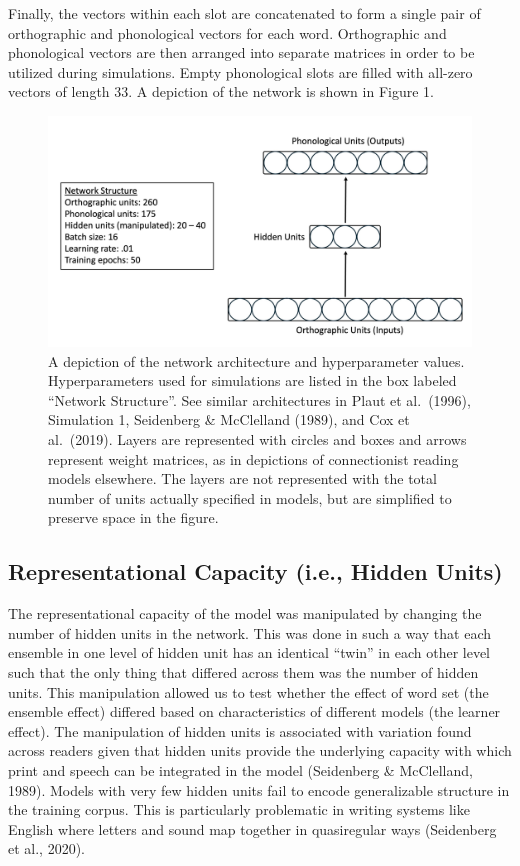\documentclass[
  ,man,floatsintext]{apa6}
\begin{document}
Finally, the vectors within each slot are concatenated to form a single pair of orthographic and phonological vectors for each word. Orthographic and phonological vectors are then arranged into separate matrices in order to be utilized during simulations. Empty phonological slots are filled with all-zero vectors of length 33. A depiction of the network is shown in Figure 1.

\begin{figure}
\centering
\includegraphics{img/figure_1.jpg}
\caption{\label{fig:figure1}A depiction of the network architecture and hyperparameter values. Hyperparameters used for simulations are listed in the box labeled ``Network Structure''. See similar architectures in Plaut et al.~(1996), Simulation 1, Seidenberg \& McClelland (1989), and Cox et al.~(2019). Layers are represented with circles and boxes and arrows represent weight matrices, as in depictions of connectionist reading models elsewhere. The layers are not represented with the total number of units actually specified in models, but are simplified to preserve space in the figure.}
\end{figure}

\hypertarget{representational-capacity-i.e.-hidden-units}{%
\subsection{Representational Capacity (i.e., Hidden Units)}\label{representational-capacity-i.e.-hidden-units}}

The representational capacity of the model was manipulated by changing the number of hidden units in the network. This was done in such a way that each ensemble in one level of hidden unit has an identical ``twin'' in each other level such that the only thing that differed across them was the number of hidden units. This manipulation allowed us to test whether the effect of word set (the ensemble effect) differed based on characteristics of different models (the learner effect). The manipulation of hidden units is associated with variation found across readers given that hidden units provide the underlying capacity with which print and speech can be integrated in the model (Seidenberg \& McClelland, 1989). Models with very few hidden units fail to encode generalizable structure in the training corpus. This is particularly problematic in writing systems like English where letters and sound map together in quasiregular ways (Seidenberg et al., 2020).
\end{document}
